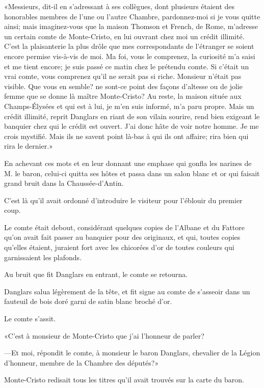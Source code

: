 «Messieurs, dit-il en s'adressant à ses collègues, dont plusieurs étaient des honorables membres de l'une ou l'autre Chambre, pardonnez-moi si je vous quitte ainsi; mais imaginez-vous que la maison Thomson et French, de Rome, m'adresse un certain comte de Monte-Cristo, en lui ouvrant chez moi un crédit illimité. C'est la plaisanterie la plus drôle que mes correspondants de l'étranger se soient encore permise vis-à-vis de moi. Ma foi, vous le comprenez, la curiosité m'a saisi et me tient encore; je suis passé ce matin chez le prétendu comte. Si c'était un vrai comte, vous comprenez qu'il ne serait pas si riche. Monsieur n'était pas visible. Que vous en semble? ne sont-ce point des façons d'altesse ou de jolie femme que se donne là maître Monte-Cristo? Au reste, la maison située aux Champs-Élysées et qui est à lui, je m'en suis informé, m'a paru propre. Mais un crédit illimité, reprit Danglars en riant de son vilain sourire, rend bien exigeant le banquier chez qui le crédit est ouvert. J'ai donc hâte de voir notre homme. Je me crois mystifié. Mais ils ne savent point là-bas à qui ils ont affaire; rira bien qui rira le dernier.» 

En achevant ces mots et en leur donnant une emphase qui gonfla les narines de M. le baron, celui-ci quitta ses hôtes et passa dans un salon blanc et or qui faisait grand bruit dans la Chaussée-d'Antin. 

C'est là qu'il avait ordonné d'introduire le visiteur pour l'éblouir du premier coup. 

Le comte était debout, considérant quelques copies de l'Albane et du Fattore qu'on avait fait passer au banquier pour des originaux, et qui, toutes copies qu'elles étaient, juraient fort avec les chicorées d'or de toutes couleurs qui garnissaient les plafonds. 

Au bruit que fit Danglars en entrant, le comte se retourna. 

Danglars salua légèrement de la tête, et fit signe au comte de s'asseoir dans un fauteuil de bois doré garni de satin blanc broché d'or. 

Le comte s'assit. 

«C'est à monsieur de Monte-Cristo que j'ai l'honneur de parler? 

—Et moi, répondit le comte, à monsieur le baron Danglars, chevalier de la Légion d'honneur, membre de la Chambre des députés?» 

Monte-Cristo redisait tous les titres qu'il avait trouvés sur la carte du baron. 

